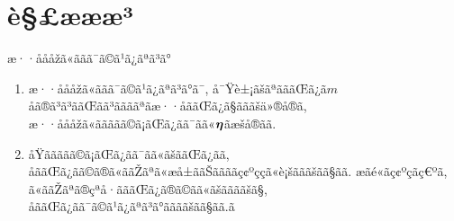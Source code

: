 \documentclass[dvipdfmx]{beamer} %
\newcommand{\bm}[1]{\mbox{\boldmath $#1$}}
\begin{document}
\section{è§£æææ³}
\begin{frame}{æ··åååžã«ããã¯ã©ã¹ã¿ãªã³ã°}
\begin{enumerate}
\item
æ··åååžã«ããã¯ã©ã¹ã¿ãªã³ã°ã¯, å¯Ÿè±¡ãšãªãããŒã¿ã$m$åã®ã³ã³ããŒãã³ããããªãæ··åããŒã¿ã§ãããšä»®å®ã, æ··åååžã«ããããã©ã¡ãŒã¿ãã¯ãã«$\bm \eta$ãæšå®ãã. 

\vspace{0.2cm}
\item
åŸããããã©ã¡ãŒã¿ãã¯ãã«ãšããŒã¿ãã, åããŒã¿ãã©ã®ã«ããŽãªã«æå±ããŠããããç¢ºççã«è¡šãããšãã§ãã. æãé«ãç¢ºçãç€ºã, ã«ããŽãªã®çªå·ãããŒã¿ã®ã©ãã«ãšããããšã§, åããŒã¿ãã¯ã©ã¹ã¿ãªã³ã°ããããšãã§ãã.ã
 
\end{enumerate}

\end{frame}

\end{document}
